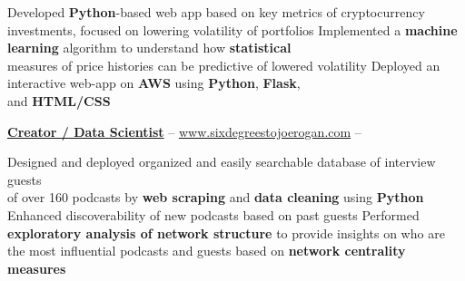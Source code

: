 \documentclass[letterpaper,MMMyyyy,nonstopmode]{simpleresumecv}
\begin{document}
\begin{Body}
\begin{Detail}


\Gap

\BulletItem
Developed \textbf{Python}-based web app based on key metrics of cryptocurrency \\investments, focused on lowering volatility of portfolios
\BulletItem
Implemented a \textbf{machine learning} algorithm to understand how \textbf{statistical} \\measures of price histories can be predictive of lowered volatility
\BulletItem
Deployed an interactive web-app on \textbf{AWS} using \textbf{Python}, \textbf{Flask}, \\ and \textbf{HTML/CSS}

\vspace{1.5mm}





\Entry

\href{http://www.sixdegreestojoerogan.com/}
{\textbf{Creator / Data Scientist}} -- \href{http://www.sixdegreestojoerogan.com/}{www.sixdegreestojoerogan.com} \hfill {} -- 








\Gap


\BulletItem
Designed and deployed organized and easily searchable database of interview guests \\of over 160 podcasts by \textbf{web scraping} and \textbf{data cleaning} using \textbf{Python}
\BulletItem
Enhanced discoverability of new podcasts based on past guests
\BulletItem
Performed \textbf{exploratory analysis of network structure} to provide insights on who are the most influential podcasts and guests based on \textbf{network centrality measures}%
\vspace{1.5mm}


\end{Detail}
\end{Body}
\end{document}
